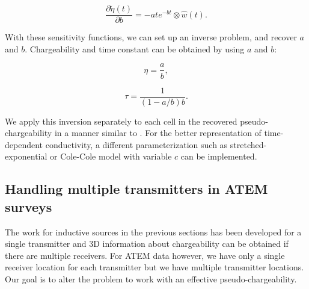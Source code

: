 \documentclass[extra,mreferee]{gji}
\newcommand{\peta}{\tilde{\eta}}
\begin{document}
\begin{linenomath*}
\begin{equation}
  \frac{\partial \peta(t)}{\partial b} = -ate^{-bt} \otimes \hat{w}(t).
\end{equation}
\end{linenomath*}
With these sensitivity functions, we can set up an inverse problem, and recover $a$ and $b$. 
Chargeability and time constant can be obtained by using $a$ and $b$:
\begin{linenomath*}
\begin{equation}
  \eta =  \frac{a}{b},
\end{equation}
\end{linenomath*}
\begin{linenomath*}
\begin{equation}
  \tau =  \frac{1}{(1-a/b)b}.
\end{equation}
\end{linenomath*}
We apply this inversion separately to each cell in the recovered pseudo-chargeability  in a manner similar to \cite[]{Yuval1997}.
For the better representation of time-dependent conductivity, a different parameterization such as stretched-exponential \cite[]{Kohlrausch1854} or Cole-Cole model with variable $c$ can be implemented. 

\subsection{Handling multiple transmitters in ATEM surveys}
\label{subsection: Handling multiple transmitters in ATEM surveys}
The work for inductive sources in the previous sections has been developed for a single transmitter and 3D information about chargeability can be obtained if there are multiple receivers. For ATEM data however, we have only a single receiver location for each transmitter but we have multiple transmitter locations. 
Our goal is to alter the problem to work with an effective pseudo-chargeability. 
\end{document}
